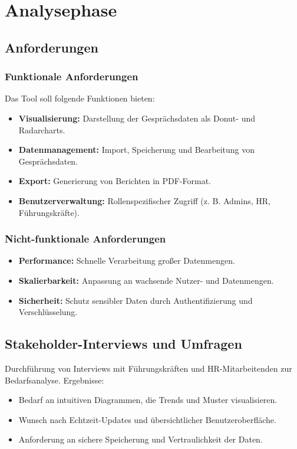 \chapter{Analysephase}
\label{chap:analysephase}

\section{Anforderungen}
\subsection{Funktionale Anforderungen}
Das Tool soll folgende Funktionen bieten:
\begin{itemize}
    \item \textbf{Visualisierung:} Darstellung der Gesprächsdaten als Donut- und Radarcharts.
    \item \textbf{Datenmanagement:} Import, Speicherung und Bearbeitung von Gesprächsdaten.
    \item \textbf{Export:} Generierung von Berichten in PDF-Format.
    \item \textbf{Benutzerverwaltung:} Rollenspezifischer Zugriff (z. B. Admins, HR, Führungskräfte).
\end{itemize}

\subsection{Nicht-funktionale Anforderungen}
\begin{itemize}
    \item \textbf{Performance:} Schnelle Verarbeitung großer Datenmengen.
    \item \textbf{Skalierbarkeit:} Anpassung an wachsende Nutzer- und Datenmengen.
    \item \textbf{Sicherheit:} Schutz sensibler Daten durch Authentifizierung und Verschlüsselung.
\end{itemize}

\section{Stakeholder-Interviews und Umfragen}
Durchführung von Interviews mit Führungskräften und HR-Mitarbeitenden zur Bedarfsanalyse.  
Ergebnisse:
\begin{itemize}
    \item Bedarf an intuitiven Diagrammen, die Trends und Muster visualisieren.
    \item Wunsch nach Echtzeit-Updates und übersichtlicher Benutzeroberfläche.
    \item Anforderung an sichere Speicherung und Vertraulichkeit der Daten.
\end{itemize}

